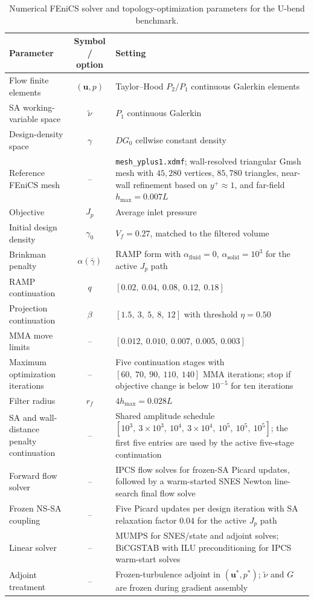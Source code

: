 \begin{table}[htbp]
	\centering
	\footnotesize
	\caption{Numerical FEniCS solver and topology-optimization parameters for the U-bend benchmark.}
	\label{tab:app_B_alexandersen_ubend_numerical}
	\renewcommand{\arraystretch}{1.2}
	\begin{tabularx}{\textwidth}{l c X}
		\hline
		\textbf{Parameter} & \textbf{Symbol / option} & \textbf{Setting} \\
		\hline
		Flow finite elements & $(\mathbf{u},p)$ & Taylor--Hood $P_2/P_1$ continuous Galerkin elements \\
		SA working-variable space & $\tilde{\nu}$ & $P_1$ continuous Galerkin \\
		Design-density space & $\gamma$ & $DG_0$ cellwise constant density \\
		Reference FEniCS mesh & -- & \texttt{mesh\_yplus1.xdmf}; wall-resolved triangular Gmsh mesh with $45{,}280$ vertices, $85{,}780$ triangles, near-wall refinement based on $y^+\approx1$, and far-field $h_{\max}=0.007L$ \\
		Objective & $J_p$ & Average inlet pressure \\
		Initial design density & $\gamma_0$ & $V_f=0.27$, matched to the filtered volume \\
			Brinkman penalty & $\alpha(\bar{\gamma})$ & RAMP form with $\alpha_{\mathrm{fluid}}=0$, $\alpha_{\mathrm{solid}}=10^3$ for the active $J_p$ path \\
			RAMP continuation & $q$ & $[0.02,\ 0.04,\ 0.08,\ 0.12,\ 0.18]$ \\
			Projection continuation & $\beta$ & $[1.5,\ 3,\ 5,\ 8,\ 12]$ with threshold $\eta=0.50$ \\
			MMA move limits & -- & $[0.012,\ 0.010,\ 0.007,\ 0.005,\ 0.003]$ \\
			Maximum optimization iterations & -- & Five continuation stages with $[60,\ 70,\ 90,\ 110,\ 140]$ MMA iterations; stop if objective change is below $10^{-5}$ for ten iterations \\
			Filter radius & $r_f$ & $4h_{\max}=0.028L$ \\
			SA and wall-distance penalty continuation & -- & Shared amplitude schedule $[10^3,\ 3\times10^3,\ 10^4,\ 3\times10^4,\ 10^5,\ 10^5,\ 10^5]$; the first five entries are used by the active five-stage continuation \\
			Forward flow solver & -- & IPCS flow solves for frozen-SA Picard updates, followed by a warm-started SNES Newton line-search final flow solve \\
			Frozen NS-SA coupling & -- & Five Picard updates per design iteration with SA relaxation factor $0.04$ for the active $J_p$ path \\
			Linear solver & -- & MUMPS for SNES/state and adjoint solves; BiCGSTAB with ILU preconditioning for IPCS warm-start solves \\
		Adjoint treatment & -- & Frozen-turbulence adjoint in $(\mathbf{u}^*,p^*)$; $\tilde{\nu}$ and $G$ are frozen during gradient assembly \\
		\hline
	\end{tabularx}
\end{table}

